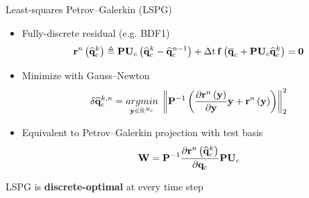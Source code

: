 \documentclass[]{beamer}
\begin{document}
\begin{frame}{Least-squares Petrov--Galerkin (LSPG)\footnotemark[2]}
    \begin{itemize}
		\item Fully-discrete residual (e.g. BDF1)
		\begin{equation*}
			\resFuncIter{\timeIdx}{\consVecCoef^{\newtonIdx}} \triangleq \consScale \consTrial \left( \consVecCoef^{\newtonIdx} - \consVecCoef^{\timeIdx-1} \right) + \dt \, \rhsFunc{\consVecCent + \consScale \consTrial \consVecCoef^{\newtonIdx}} = \zeroVec
		\end{equation*}
		\item Minimize with Gauss--Newton
		\begin{equation*}
			\delta \consVecCoef^{\newtonIdx, \timeIdx} = \argmin{\dummyVec \in \mathbb{R}^{\numConsvModes}} \norm{\consScaleInv \left(\pde{\resFuncIter{\timeIdx}{\dummyVec}}{\dummyVec} \dummyVec + \resFuncIter{\timeIdx}{\dummyVec}\right)}_2^2
		\end{equation*}
		\item Equivalent to Petrov--Galerkin projection with test basis
		\begin{equation*}
			\testBasis = \consScaleInv \pde{\resFuncIter{\timeIdx}{\consVecCoef^{\newtonIdx}}}{\consVec} \consScale \consTrial
		\end{equation*}
	\end{itemize}
	\vspace{-1em}
	\begin{tcolorbox}[colframe=blue!50!white,halign=center]
		LSPG is \textbf{discrete-optimal} at every time step
	\end{tcolorbox}
\end{frame}
\end{document}
